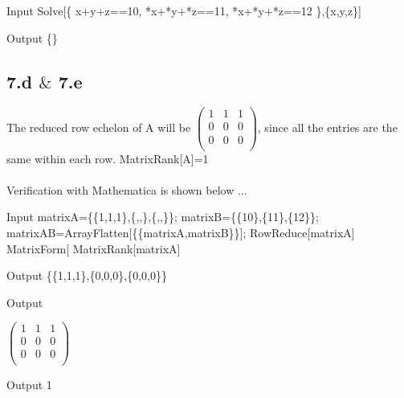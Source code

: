 \documentclass[11pt,a4paper]{article}
\begin{document}
\begin{mmaCell}[morefunctionlocal={x, y, z}]{Input}
Solve[\{
x+y+z==10,
*x+*y+*z==11,
*x+*y+*z==12
\},\{x,y,z\}]
\end{mmaCell}

\begin{mmaCell}{Output}
\{\}
\end{mmaCell}

\subsection*{7.d $\&$ 7.e}

The reduced row echelon of A will be \(\left(
\begin{array}{ccc}
 1 & 1 & 1 \\
 0 & 0 & 0 \\
 0 & 0 & 0 \\
\end{array}
\right)\), since all the entries are the same within each row. MatrixRank[A]=1\\
\\
Verification with Mathematica is shown below ...

\begin{mmaCell}[moredefined={matrixA, matrixB, matrixAB}]{Input}
matrixA=\{\{1,1,1\},\{,,\},\{,,\}\};
matrixB=\{\{10\},\{11\},\{12\}\};
matrixAB=ArrayFlatten[\{\{matrixA,matrixB\}\}];
RowReduce[matrixA]
MatrixForm[%
MatrixRank[matrixA]
\end{mmaCell}

\begin{mmaCell}{Output}
\{\{1,1,1\},\{0,0,0\},\{0,0,0\}\}
\end{mmaCell}

\begin{mmaCell}[form=MatrixForm]{Output}

\end{mmaCell}
\begin{doublespace}
\noindent\(\left(
\begin{array}{ccc}
 1 & 1 & 1 \\
 0 & 0 & 0 \\
 0 & 0 & 0 \\
\end{array}
\right)\)
\end{doublespace}

\begin{mmaCell}{Output}
1
\end{mmaCell}
\end{document}
